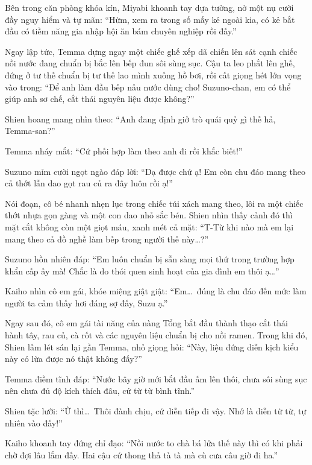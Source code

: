 \documentclass[../main.tex]{subfiles}
\begin{document}
Bên trong căn phòng khóa kín, Miyabi khoanh tay dựa tường, nở một nụ cười đầy nguy hiểm và tự mãn: ``Hừm, xem ra trong số mấy kẻ ngoài kia, có kẻ bắt đầu có tiềm năng gia nhập hội ăn bám chuyên nghiệp rồi đấy.''

Ngay lập tức, Temma dựng ngay một chiếc ghế xếp dã chiến lên sát cạnh chiếc nồi nước đang chuẩn bị bắc lên bếp đun sôi sùng sục. Cậu ta leo phắt lên ghế, đứng ở tư thế chuẩn bị tư thế lao mình xuống hồ bơi, rồi cất giọng hét lớn vọng vào trong: ``Để anh làm đầu bếp nấu nước dùng cho! Suzuno-chan, em có thể giúp anh sơ chế, cắt thái nguyên liệu được không?''


Shien hoang mang nhìn theo: ``Anh đang định giở trò quái quỷ gì thế hả, Temma-san?''

Temma nháy mắt: ``Cứ phối hợp làm theo anh đi rồi khắc biết!''

Suzuno mỉm cười ngọt ngào đáp lời: ``Dạ được chứ ạ! Em còn chu đáo mang theo cả thớt lẫn dao gọt rau củ ra đây luôn rồi ạ!''

Nói đoạn, cô bé nhanh nhẹn lục trong chiếc túi xách mang theo, lôi ra một chiếc thớt nhựa gọn gàng và một con dao nhỏ sắc bén. Shien nhìn thấy cảnh đó thì mặt cắt không còn một giọt máu, xanh mét cả mặt: ``T-Từ khi nào mà em lại mang theo cả đồ nghề làm bếp trong người thế này\dots?''

Suzuno hồn nhiên đáp: ``Em luôn chuẩn bị sẵn sàng mọi thứ trong trường hợp khẩn cấp ấy mà! Chắc là do thói quen sinh hoạt của gia đình em thôi ạ\dots''

Kaiho nhìn cô em gái, khóe miệng giật giật: ``Em\dots\ đúng là chu đáo đến mức làm người ta cảm thấy hơi đáng sợ đấy, Suzu ạ.''

Ngay sau đó, cô em gái tài năng của nàng Tổng bắt đầu thành thạo cắt thái hành tây, rau củ, cà rốt và các nguyên liệu chuẩn bị cho nồi ramen. Trong khi đó, Shien lấm lét sán lại gần Temma, nhỏ giọng hỏi: ``Này, liệu đứng diễn kịch kiểu này có lừa được nó thật không đấy?''

Temma điềm tĩnh đáp: ``Nước bây giờ mới bắt đầu ấm lên thôi, chưa sôi sùng sục nên chưa đủ độ kích thích đâu, cứ từ từ bình tĩnh.''

Shien tặc lưỡi: ``Ừ thì\dots\ Thôi đành chịu, cứ diễn tiếp đi vậy. Nhớ là diễn từ từ, tự nhiên vào đấy!''

Kaiho khoanh tay đứng chỉ đạo: ``Nồi nước to chà bá lửa thế này thì có khi phải chờ đợi lâu lắm đấy. Hai cậu cứ thong thả tà tà mà cù cưa câu giờ đi ha.''
\end{document}
